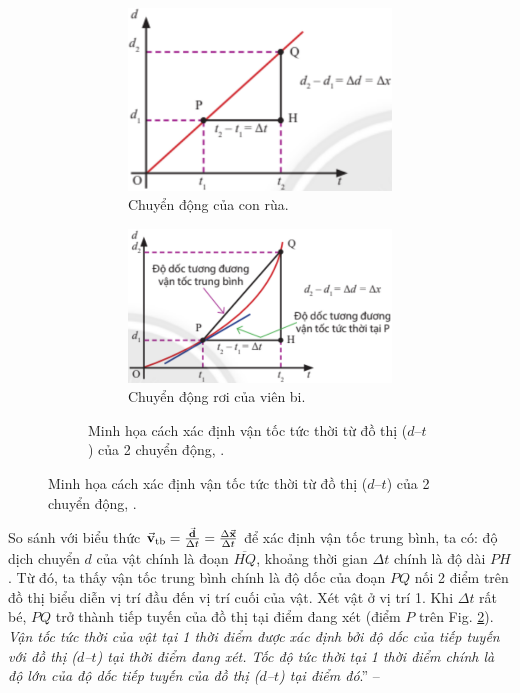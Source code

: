 \documentclass{article}
\numberwithin{equation}{section}
\begin{document}
\begin{figure}[H]
	\begin{figure}[H]
		\centering
		\begin{subfigure}{.5\textwidth}
			\centering
			\includegraphics[width=.5\linewidth]{chuyen_dong_cua_con_rua}
			\caption{Chuyển động của con rùa.}
		\end{subfigure}%
		\begin{subfigure}{.5\textwidth}
			\centering
			\includegraphics[width=.6\linewidth]{chuyen_dong_roi_cua_vien_bi}
			\caption{Chuyển động rơi của viên bi.}
		\end{subfigure}
		\caption{Minh họa cách xác định vận tốc tức thời từ đồ thị ($d$--$t$) của 2 chuyển động, \cite[Hình 4.10, p. 29]{SGK_Vat_Ly_10_Chan_Troi_Sang_Tao}.}
		\label{fig:chuyen_dong_cua_con_rua_vien_bi}
	\end{figure}
\end{figure}
So sánh với biểu thức $\vec{\bf v}_{\rm tb} = \frac{\vec{\bf d}}{\Delta t} = \frac{\Delta\vec{\bf x}}{\Delta t}$ để xác định vận tốc trung bình, ta có: độ dịch chuyển $d$ của vật chính là đoạn $\overline{HQ}$, khoảng thời gian $\Delta t$ chính là độ dài $PH$. Từ đó, ta thấy vận tốc trung bình chính là độ dốc của đoạn $PQ$ nối 2 điểm trên đồ thị biểu diễn vị trí đầu đến vị trí cuối của vật. Xét vật ở vị trí 1. Khi $\Delta t$ rất bé, $PQ$ trở thành tiếp tuyến của đồ thị tại điểm đang xét (điểm $P$ trên Fig. \ref{fig:chuyen_dong_cua_con_rua_vien_bi}). \textit{Vận tốc tức thời của vật tại 1 thời điểm được xác định bởi độ dốc của tiếp tuyến với đồ thị ($d$--$t$) tại thời điểm đang xét. Tốc độ tức thời tại 1 thời điểm chính là độ lớn của độ dốc tiếp tuyến của đồ thị ($d$--$t$) tại điểm đó}.'' -- \cite[p. 29]{SGK_Vat_Ly_10_Chan_Troi_Sang_Tao}
\end{document}
